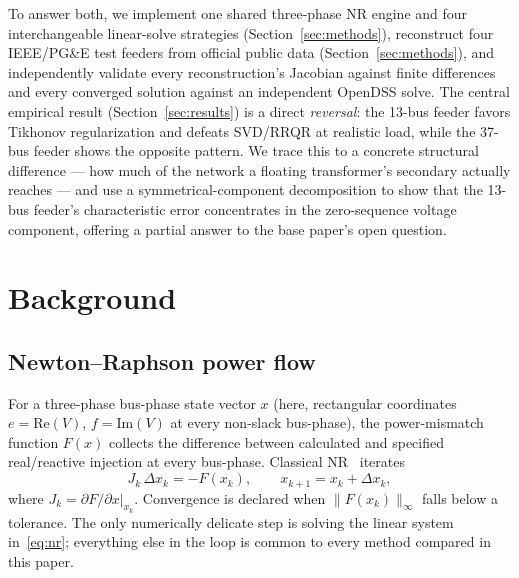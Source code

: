 \documentclass[conference]{IEEEtran}
\begin{document}
To answer both, we implement one shared three-phase NR engine and four
interchangeable linear-solve strategies (Section~\ref{sec:methods}),
reconstruct four IEEE/PG\&E test feeders from official public data
(Section~\ref{sec:methods}), and independently validate every
reconstruction's Jacobian against finite differences and every converged
solution against an independent OpenDSS solve. The central empirical
result (Section~\ref{sec:results}) is a direct \emph{reversal}: the 13-bus
feeder favors Tikhonov regularization and defeats SVD/RRQR at realistic
load, while the 37-bus feeder shows the opposite pattern. We trace this to
a concrete structural difference --- how much of the network a floating
transformer's secondary actually reaches --- and use a symmetrical-component
decomposition to show that the 13-bus feeder's characteristic error
concentrates in the zero-sequence voltage component, offering a partial
answer to the base paper's open question.

\section{Background}
\label{sec:background}

\subsection{Newton--Raphson power flow}
For a three-phase bus-phase state vector $x$ (here, rectangular
coordinates $e = \mathrm{Re}(V)$, $f = \mathrm{Im}(V)$ at every non-slack
bus-phase), the power-mismatch function $F(x)$ collects the difference
between calculated and specified real/reactive injection at every
bus-phase. Classical NR~\cite{tinney1967power} iterates
\begin{equation}
J_k \, \Delta x_k = -F(x_k), \qquad x_{k+1} = x_k + \Delta x_k,
\label{eq:nr}
\end{equation}
where $J_k = \partial F / \partial x \big|_{x_k}$. Convergence is declared
when $\|F(x_k)\|_\infty$ falls below a tolerance. The only numerically
delicate step is solving the linear system in~\eqref{eq:nr}; everything
else in the loop is common to every method compared in this paper.
\end{document}
